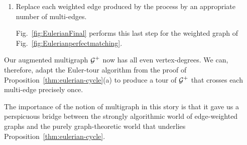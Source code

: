 \begin{enumerate}

\item
Replace each weighted edge produced by the process by an appropriate number of multi-edges.

\smallskip

Fig.~\ref{fig:EulerianFinal} performs this last step for the weighted graph of Fig.~\ref{fig:Eulerianperfectmatching}.
\end{enumerate}

\smallskip

Our augmented multigraph $\mbox{$\cal G$}^+$ now has all even vertex-degrees.  We can, therefore, adapt the Euler-tour algorithm from the proof of Proposition~\ref{thm:eulerian-cycle}(a) to produce a tour of $\mbox{$\cal G$}^+$ that crosses each multi-edge precisely once.

\medskip

The importance of the notion of multigraph in this story is that it gave us a perspicuous bridge between the strongly algorithmic world of edge-weighted graphs and the purely graph-theoretic world that underlies Proposition~\ref{thm:eulerian-cycle}.
